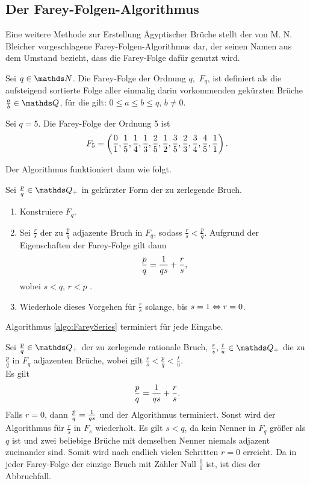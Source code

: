 \subsection{Der Farey-Folgen-Algorithmus}
Eine weitere Methode zur Erstellung Ägyptischer Brüche stellt der von M. N. Bleicher vorgeschlagene Farey-Folgen-Algorithmus dar, der seinen Namen aus dem Umstand bezieht, dass die Farey-Folge dafür genutzt wird. \cite[S. 88]{Guy1981}
\begin{def1}
	Sei $q \in \N$. Die Farey-Folge der Ordnung $q$, $\, F_q$, ist definiert als die aufsteigend sortierte Folge aller einmalig darin vorkommenden gekürzten Brüche $\frac{a}{b} \in \Q$, für die gilt:
	$0\leq a \leq b \leq q,\, b\neq 0$.
\end{def1}

\begin{bsp}
	Sei $q=5$. Die Farey-Folge der Ordnung 5 ist
	$$F_5 = \left(\frac{0}{1}, \frac{1}{5}, \frac{1}{4}, \frac{1}{3}, \frac{2}{5}, \frac{1}{2}, \frac{3}{5}, \frac{2}{3}, \frac{3}{4}, \frac{4}{5}, \frac{1}{1} \right).$$
\end{bsp}

Der Algorithmus funktioniert dann wie folgt.
\begin{algorithm}\label{algo:FareySeries}
	Sei $\frac{p}{q} \in \Q_+$ in gekürzter Form der zu zerlegende Bruch.
	\begin{enumerate}
		\item Konstruiere $F_q$.
		\item Sei $\frac{r}{s}$ der zu $\frac{p}{q}$ adjazente Bruch in $F_q$, sodass $\frac{r}{s} < \frac{p}{q}$. Aufgrund der Eigenschaften der Farey-Folge gilt dann
		$$\frac{p}{q} = \frac{1}{qs} + \frac{r}{s},$$ wobei $s<q,\, r<p$ \cite[S. 425]{Beck2000}.
		\item Wiederhole dieses Vorgehen für $\frac{r}{s}$ solange, bis $s=1 \Leftrightarrow r=0$.
	\end{enumerate}
\end{algorithm}
\begin{satz}
	Algorithmus \ref{algo:FareySeries} terminiert für jede Eingabe.
\end{satz}
\begin{bew}
	Sei $\frac{p}{q} \in \Q_+$ der zu zerlegende rationale Bruch, $\frac{r}{s}, \frac{t}{u} \in \Q_+$ die zu $\frac{p}{q}$ in $F_q$ adjazenten Brüche, wobei gilt $\frac{r}{s}<\frac{p}{q} < \frac{t}{u}$.\\
	Es gilt $$\frac{p}{q} = \frac{1}{qs}+\frac{r}{s}.$$
	Falls $r = 0$, dann $\frac{p}{q} = \frac{1}{qs}$ und der Algorithmus terminiert.
	Sonst wird der Algorithmus für $\frac{r}{s}$ in $F_s$ wiederholt. Es gilt $s<q$, da kein Nenner in $F_q$ größer als $q$ ist und zwei beliebige Brüche mit demselben Nenner niemals adjazent zueinander sind. Somit wird nach endlich vielen Schritten $r=0$ erreicht. Da in jeder Farey-Folge der einzige Bruch mit Zähler Null $\frac{0}{1}$ ist, ist dies der Abbruchfall.
\end{bew}

